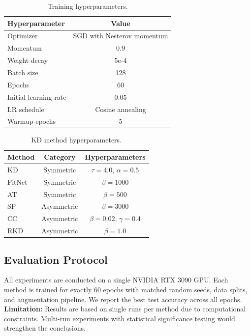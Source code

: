 \documentclass[symmetry,article,submit,pdftex,moreauthors]{Definitions/mdpi}
\begin{document}
\begin{table}[H]
\caption{Training hyperparameters.\label{tab:hyperparams}}
\begin{tabularx}{\textwidth}{lC}
\toprule
\textbf{Hyperparameter} & \textbf{Value}\\
\midrule
Optimizer & SGD with Nesterov momentum\\
Momentum & 0.9\\
Weight decay & 5e-4\\
Batch size & 128\\
Epochs & 60\\
Initial learning rate & 0.05\\
LR schedule & Cosine annealing\\
Warmup epochs & 5\\
\bottomrule
\end{tabularx}
\end{table}

\begin{table}[H]
\caption{KD method hyperparameters.\label{tab:kdparams}}
\begin{tabularx}{\textwidth}{lCC}
\toprule
\textbf{Method} & \textbf{Category} & \textbf{Hyperparameters}\\
\midrule
KD~\cite{ref7} & Symmetric & $\tau=4.0$, $\alpha=0.5$\\
FitNet~\cite{ref8} & Symmetric & $\beta=1000$\\
AT~\cite{ref9} & Symmetric & $\beta=500$\\
SP~\cite{ref10} & Asymmetric & $\beta=3000$\\
CC~\cite{ref11} & Asymmetric & $\beta=0.02$, $\gamma=0.4$\\
RKD~\cite{ref12} & Asymmetric & $\beta=1.0$\\
\bottomrule
\end{tabularx}
\end{table}

\subsection{Evaluation Protocol}

All experiments are conducted on a single NVIDIA RTX 3090 GPU. Each method is trained for exactly 60 epochs with matched random seeds, data splits, and augmentation pipeline. We report the best test accuracy across all epochs. \textbf{Limitation:} Results are based on single runs per method due to computational constraints. Multi-run experiments with statistical significance testing would strengthen the conclusions.
\end{document}
